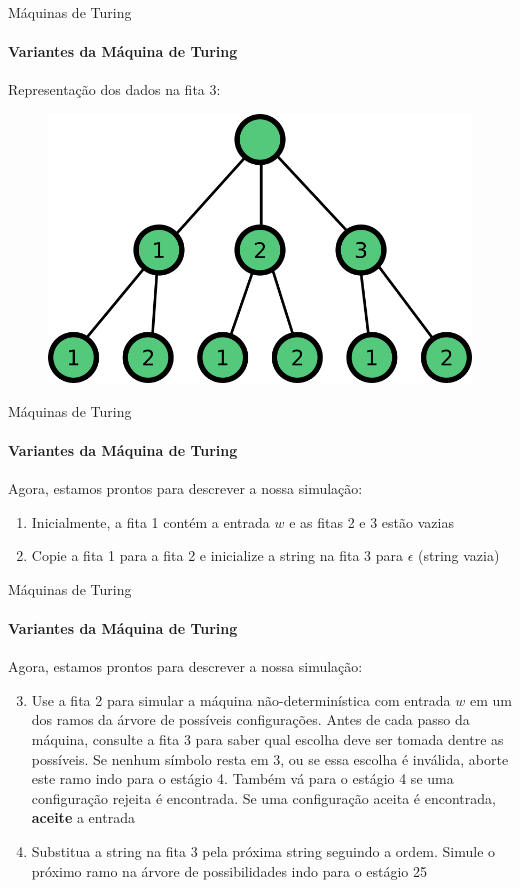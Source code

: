 \documentclass{beamer}
\begin{document}
\begin{frame}{Máquinas de Turing}
	\framesubtitle{Variantes da Máquina de Turing}
	Representação dos dados na fita 3:
	\begin{figure}
		\includegraphics[width=0.5\paperwidth]{resources/tree}
	\end{figure}
\end{frame}
\begin{frame}{Máquinas de Turing}
	\framesubtitle{Variantes da Máquina de Turing}
	Agora, estamos prontos para descrever a nossa simulação:
	\begin{enumerate}
		\item Inicialmente, a fita 1 contém a entrada $w$ e as fitas 2 e 3 estão vazias
		\item Copie a fita 1 para a fita 2 e inicialize a string na fita 3 para $\epsilon$ (string vazia)
	\end{enumerate}
\end{frame}
\begin{frame}{Máquinas de Turing}
	\framesubtitle{Variantes da Máquina de Turing}
	Agora, estamos prontos para descrever a nossa simulação:
	\begin{enumerate}
		\setcounter{enumi}{2}
		\item Use a fita 2 para simular a máquina não-determinística com entrada $w$ em um dos ramos da árvore de possíveis configurações. Antes de cada passo da máquina, consulte a fita 3 para saber qual escolha deve ser tomada dentre as possíveis. Se nenhum símbolo resta em 3, ou se essa escolha é inválida, aborte este ramo indo para o estágio 4. Também vá para o estágio 4 se uma configuração \alert{rejeita} é encontrada. Se uma configuração \alert{aceita} é encontrada, \textbf{aceite} a entrada
		\item Substitua a string na fita 3 pela próxima string seguindo a ordem. Simule o próximo ramo na árvore de possibilidades indo para o estágio 25
	\end{enumerate}
\end{frame}
\end{document}
